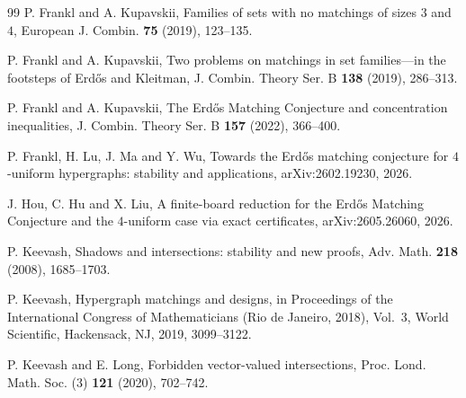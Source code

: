 \documentclass[10pt,a4paper]{article}
\numberwithin{equation}{section}
\theoremstyle{definition}
\begin{document}
\begin{thebibliography}{99}
        P. Frankl and A. Kupavskii,
        Families of sets with no matchings of sizes $3$ and $4$,
        European J. Combin. \textbf{75} (2019), 123--135.

        P. Frankl and A. Kupavskii,
        Two problems on matchings in set families---in the footsteps of Erd\H{o}s and Kleitman,
        J. Combin. Theory Ser. B \textbf{138} (2019), 286--313.

        P. Frankl and A. Kupavskii,
        The Erd\H{o}s Matching Conjecture and concentration inequalities,
        J. Combin. Theory Ser. B \textbf{157} (2022), 366--400.

        P. Frankl, H. Lu, J. Ma and Y. Wu,
        Towards the Erd\H{o}s matching conjecture for $4$-uniform hypergraphs: stability and applications,
        arXiv:2602.19230, 2026.


        J. Hou, C. Hu and X. Liu,
        A finite-board reduction for the Erd\H{o}s Matching Conjecture and the $4$-uniform case via exact certificates,
        arXiv:2605.26060, 2026.


        P. Keevash,
        Shadows and intersections: stability and new proofs,
        Adv. Math. \textbf{218} (2008), 1685--1703.

        P. Keevash,
        Hypergraph matchings and designs,
        in Proceedings of the International Congress of Mathematicians (Rio de Janeiro, 2018), Vol.~3,
        World Scientific, Hackensack, NJ, 2019, 3099--3122.

        P. Keevash and E. Long,
        Forbidden vector-valued intersections,
        Proc. Lond. Math. Soc. (3) \textbf{121} (2020), 702--742.


\end{thebibliography}
\end{document}
